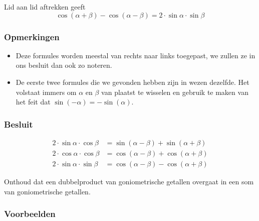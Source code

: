 \documentclass[a4paper,12pt]{article}
\begin{document}
\begin{theorie}
Lid aan lid aftrekken geeft
$$\cos(\alpha+\beta) - \cos(\alpha - \beta) = 2\cdot\sin\alpha\cdot\sin\beta$$


\subsubsection*{Opmerkingen}
\begin{itemize}
  \item Deze formules worden meestal van rechts naar links toegepast, we zullen ze in ons besluit dan ook zo noteren.
  \item De eerste twee formules die we gevonden hebben zijn in wezen dezelfde. Het volstaat immers om $\alpha$ en $\beta$ van plaatst te wisselen en gebruik te maken van het feit dat $\sin(-\alpha)=-\sin(\alpha)$.
\end{itemize}


\subsubsection*{Besluit}
\begin{align*}
  2\cdot \sin\alpha\cdot \cos\beta &= \sin(\alpha-\beta)+\sin(\alpha+\beta)\\
  2\cdot \cos\alpha\cdot \cos\beta &= \cos(\alpha-\beta)+\cos(\alpha+\beta)\\
  2\cdot \sin\alpha\cdot \sin\beta &= \cos(\alpha-\beta)-\cos(\alpha+\beta)
\end{align*}

Onthoud dat een dubbelproduct van goniometrische getallen overgaat in een som van goniometrische getallen.

\subsubsection*{Voorbeelden}


\end{theorie}
\end{document}
